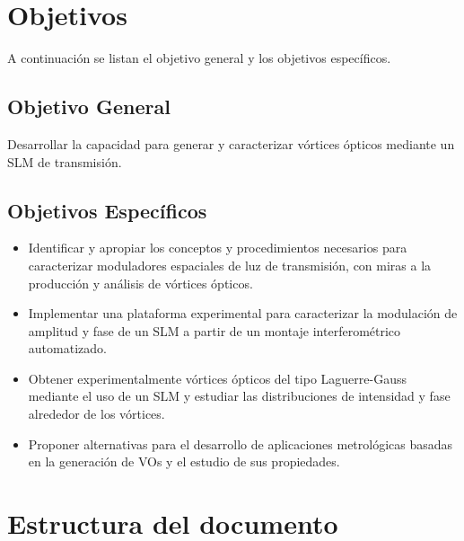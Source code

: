 \section{Objetivos}
\label{sec:objetivos}
 A continuación se listan el objetivo general y los
objetivos específicos. 
\subsection{Objetivo General}
Desarrollar la capacidad para generar y caracterizar vórtices ópticos
mediante un SLM de transmisión.
\subsection{Objetivos Específicos}
\begin{itemize}
\item Identificar y apropiar los conceptos y procedimientos necesarios
  para caracterizar moduladores espaciales de luz de transmisión, con
  miras a la producción y análisis de vórtices ópticos.
\item Implementar una plataforma experimental para caracterizar la
  modulación de amplitud y fase de un SLM a partir de un montaje
  interferométrico automatizado.
\item Obtener experimentalmente vórtices ópticos del tipo
  Laguerre-Gauss mediante el uso de un SLM y estudiar las
  distribuciones de intensidad y fase alrededor de los vórtices.
\item Proponer alternativas para el desarrollo de aplicaciones
  metrológicas basadas en la generación de VOs y el estudio de sus
  propiedades.
\end{itemize}

\section{Estructura del documento\label{sec:estructura}}

